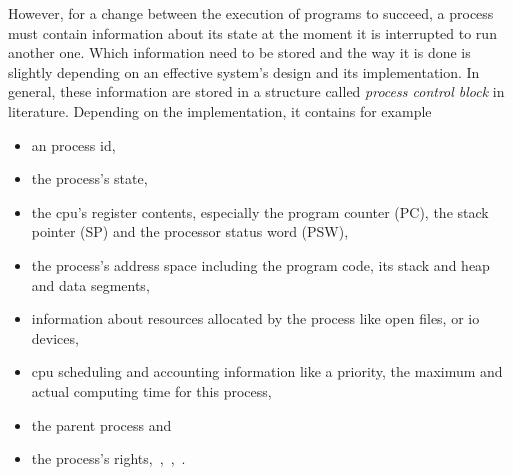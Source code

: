 However, for a change between the execution of programs to succeed, a process must contain information about its state at the moment it is interrupted to run another one.
Which information need to be stored and the way it is done is slightly depending on an effective system's design and its implementation.
In general, these information are stored in a structure called \textit{process control block} in literature\cite{tanenbaum-modern-operating-systems}.
Depending on the implementation, it contains for example
\begin{itemize}
    \item an process id, 
    \item the process's state,
    \item the \ac{cpu}'s register contents, especially the program counter (PC), the stack pointer (SP) and the processor status word (PSW),
    \item the process's address space including the program code, its stack and heap and data segments, 
    \item information about resources allocated by the process like open files, or \ac{io} devices,
    \item \ac{cpu} scheduling and accounting information like a priority, the maximum and actual computing time for this process,
    \item the parent process and
    \item the process's rights\cite{tanenbaum-modern-operating-systems},~\cite{glatz2015betriebssysteme},~\cite{achilles2006betriebssysteme},~\cite{silberschatz2009operating}.
\end{itemize}

